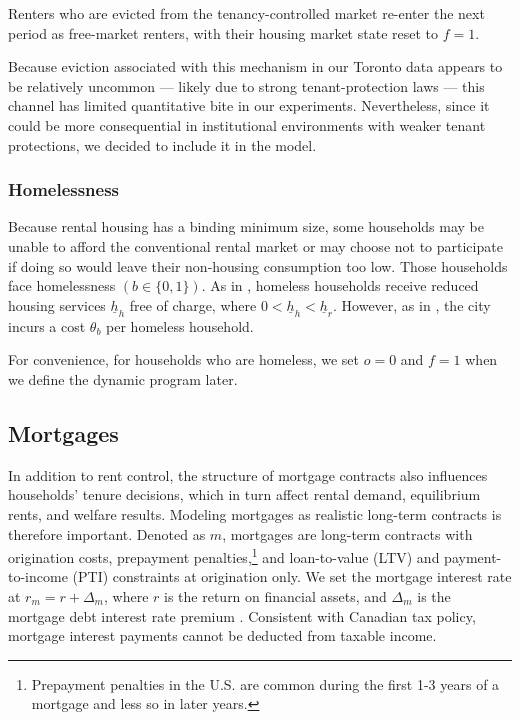 \documentclass[parskip=full]{article}
\begin{document}
Renters who are evicted from the tenancy-controlled market re-enter the next period as free-market renters, with their housing market state reset to $f=1$.

Because eviction associated with this mechanism in our Toronto data appears to be relatively uncommon — likely due to strong tenant-protection laws — this channel has limited quantitative bite in our experiments. Nevertheless, since it could be more consequential in institutional environments with weaker tenant protections, we decided to include it in the model.

\subsubsection{Homelessness}\label{sec:cohabit_homeless}

Because rental housing has a binding minimum size, some households may be unable to afford the conventional rental market or may choose not to participate if doing so would leave their non-housing consumption too low. Those households face homelessness $\left(b \in \{0,1\}\right)$. As in \citet{az-2024}, homeless households receive reduced housing services $\underline{h}_{h}$ free of charge, where $0<\underline{h}_{h}<\underline{h}_{r}$. However, as in \citet{abramson-2024}, the city incurs a cost $\theta_{b}$ per homeless household. 

For convenience, for households who are homeless, we set $o=0$ and $f=1$ when we define the dynamic program later.

\subsection{Mortgages}\label{subsection:mortgages}

In addition to rent control, the structure of mortgage contracts also influences households' tenure decisions, which in turn affect rental demand, equilibrium rents, and welfare results. Modeling mortgages as realistic long-term contracts is therefore important. Denoted as $m$, mortgages are long-term contracts with origination costs, prepayment penalties,\footnote{Prepayment penalties in the U.S. are common during the first 1-3 years of a mortgage and less so in later years.} and loan-to-value (LTV) and payment-to-income (PTI) constraints at origination only. We set the mortgage interest rate at $r_{m}=r+\Delta_m$, where $r$ is the return on financial assets, and $\Delta_m$ is the mortgage debt interest rate premium \citep{sommeretal-2013,sommersullivan-2017,kaplanetal-2019}. Consistent with Canadian tax policy, mortgage interest payments cannot be deducted from taxable income.
\end{document}
